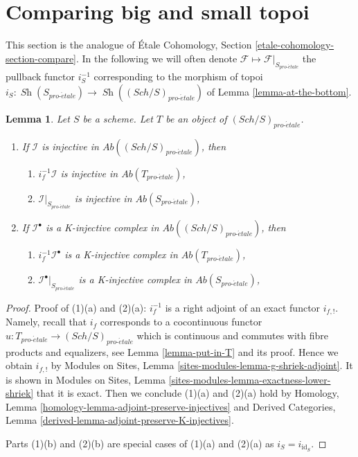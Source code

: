 \documentclass{stacks-project}
\theoremstyle{plain}
\newtheorem{lemma}[subsection]{Lemma}
\theoremstyle{definition}
\theoremstyle{remark}
\numberwithin{equation}{subsection}
\def\Sch{\mathit{Sch}}
\def\Sh{\mathop{\mathit{Sh}}\nolimits}
\def\proetale{{pro\text{-}\acute{e}tale}}
\begin{document}
\section{Comparing big and small topoi}
\label{section-compare}

\noindent
This section is the analogue of \'Etale Cohomology, Section
\ref{etale-cohomology-section-compare}. In the following we
will often denote $\mathcal{F} \mapsto \mathcal{F}|_{S_\proetale}$
the pullback functor $i_S^{-1}$ corresponding to
the morphism of topoi $i_S : \Sh(S_\proetale) \to \Sh((\Sch/S)_\proetale)$
of Lemma \ref{lemma-at-the-bottom}.

\begin{lemma}
\label{lemma-compare-injectives}
Let $S$ be a scheme. Let $T$ be an object of $(\Sch/S)_\proetale$.
\begin{enumerate}
\item If $\mathcal{I}$ is injective in $\textit{Ab}((\Sch/S)_\proetale)$, then
\begin{enumerate}
\item $i_f^{-1}\mathcal{I}$ is injective in $\textit{Ab}(T_\proetale)$,
\item $\mathcal{I}|_{S_\proetale}$ is injective in $\textit{Ab}(S_\proetale)$,
\end{enumerate}
\item If $\mathcal{I}^\bullet$ is a K-injective complex
in $\textit{Ab}((\Sch/S)_\proetale)$, then
\begin{enumerate}
\item $i_f^{-1}\mathcal{I}^\bullet$ is a K-injective complex in
$\textit{Ab}(T_\proetale)$,
\item $\mathcal{I}^\bullet|_{S_\proetale}$ is a K-injective complex in
$\textit{Ab}(S_\proetale)$,
\end{enumerate}
\end{enumerate}
\end{lemma}

\begin{proof}
Proof of (1)(a) and (2)(a): $i_f^{-1}$ is a right adjoint of an
exact functor $i_{f, !}$. Namely, recall that $i_f$ corresponds
to a cocontinuous functor $u : T_\proetale \to (\Sch/S)_\proetale$
which is continuous and commutes with fibre products and equalizers, see
Lemma \ref{lemma-put-in-T} and its proof. Hence we obtain $i_{f, !}$ by
Modules on Sites, Lemma \ref{sites-modules-lemma-g-shriek-adjoint}.
It is shown in Modules on Sites, Lemma
\ref{sites-modules-lemma-exactness-lower-shriek} that it is exact.
Then we conclude (1)(a) and (2)(a) hold by
Homology, Lemma \ref{homology-lemma-adjoint-preserve-injectives} and
Derived Categories, Lemma \ref{derived-lemma-adjoint-preserve-K-injectives}.

\medskip\noindent
Parts (1)(b) and (2)(b) are special cases of (1)(a) and (2)(a)
as $i_S = i_{\text{id}_S}$.
\end{proof}
\end{document}
